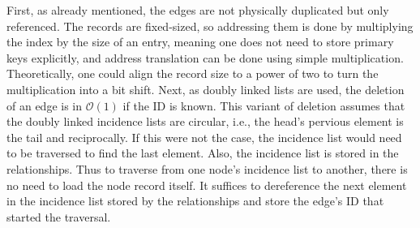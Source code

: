         First, as already mentioned, the edges are not physically duplicated but only referenced. 
        The records are fixed-sized, so addressing them is done by multiplying the index by the size of an entry, meaning one does not need to store primary keys explicitly, and address translation can be done using simple multiplication. 
        Theoretically, one could align the record size to a power of two to turn the multiplication into a bit shift.
        Next, as doubly linked lists are used, the deletion of an edge is in $\mathcal{O}(1)$ if the ID is known.
This variant of deletion assumes that the doubly linked incidence lists are circular, i.e., the head's pervious element is the tail and reciprocally.
        If this were not the case, the incidence list would need to be traversed to find the last element.
        Also, the incidence list is stored in the relationships.
        Thus to traverse from one node's incidence list to another, there is no need to load the node record itself.
        It suffices to dereference the next element in the incidence list stored by the relationships and store the edge's ID that started the traversal.
        

